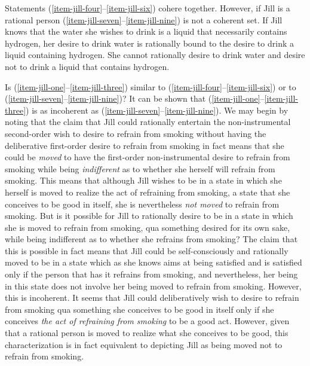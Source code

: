 \documentclass[output=paper]{langscibook}
\begin{document}
Statements  (\ref{item-jill-four}--\ref{item-jill-six}) cohere together. However, if Jill is a rational person  (\ref{item-jill-seven}--\ref{item-jill-nine}) is not a coherent set. If Jill knows that the water she wishes to drink is a liquid that necessarily contains hydrogen, her desire to drink water is rationally bound to the desire to drink a liquid containing hydrogen. She cannot rationally desire to drink water and desire not to drink a liquid that contains hydrogen. 

Is  (\ref{item-jill-one}--\ref{item-jill-three}) similar to  (\ref{item-jill-four}--\ref{item-jill-six}) or to  (\ref{item-jill-seven}--\ref{item-jill-nine})? It can be shown that  (\ref{item-jill-one}--\ref{item-jill-three}) is as incoherent as  (\ref{item-jill-seven}--\ref{item-jill-nine}).
We may begin by noting that the claim that Jill could rationally entertain the non-instrumental second-order wish to desire to refrain from smoking without having the deliberative first-order desire to refrain from smoking in fact means that she could be \textit{moved} to have the first-order non-instrumental desire to refrain from smoking while being \textit{indifferent} as to whether she herself will refrain from smoking. This means that although Jill wishes to be in a state in which she herself is moved to realize the act of refraining from smoking, a state that she conceives to be good in itself, she is nevertheless \textit{not moved} to refrain from smoking. But is it possible for Jill to rationally desire to be in a state in which she is moved to refrain from smoking, qua something desired for its own sake, while being indifferent as to whether she refrains from smoking? The claim that this is possible in fact means that Jill could be self-consciously and rationally moved to be in a state which as she knows aims at being satisfied and is satisfied only if the person that has it refrains from smoking, and nevertheless, her being in this state does not involve her being moved to refrain from smoking. However, this is incoherent. It seems that Jill could deliberatively wish to desire to refrain from smoking qua something she conceives to be good in itself only if she conceives \textit{the act of refraining from smoking} to be a good act. However, given that a rational person is moved to realize what she conceives to be good, this characterization is in fact equivalent to depicting Jill as being moved not to refrain from smoking.
\end{document}
